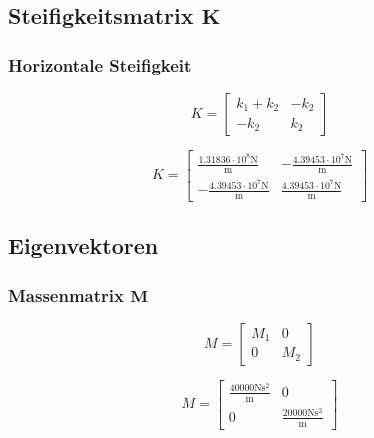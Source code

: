 \documentclass[
  letterpaper,
  DIV=11]{scrreprt}
\begin{document}
\hypertarget{steifigkeitsmatrix-mathbfk-1}{%
\subsection{\texorpdfstring{Steifigkeitsmatrix
\(\mathbf{K}\)}{Steifigkeitsmatrix \textbackslash mathbf\{K\}}}\label{steifigkeitsmatrix-mathbfk-1}}

\hypertarget{horizontale-steifigkeit-3}{%
\subsubsection{Horizontale
Steifigkeit}\label{horizontale-steifigkeit-3}}

\begin{equation}K = \left[\begin{matrix}k_{1} + k_{2} & - k_{2}\\- k_{2} & k_{2}\end{matrix}\right]\end{equation}

\begin{equation}K = \left[\begin{matrix}\frac{1.31836 \cdot 10^{8} \text{N}}{\text{m}} & - \frac{4.39453 \cdot 10^{7} \text{N}}{\text{m}}\\- \frac{4.39453 \cdot 10^{7} \text{N}}{\text{m}} & \frac{4.39453 \cdot 10^{7} \text{N}}{\text{m}}\end{matrix}\right]\end{equation}

\hypertarget{eigenvektoren-4}{%
\subsection{Eigenvektoren}\label{eigenvektoren-4}}

\hypertarget{massenmatrix-mathbfm-3}{%
\subsubsection{\texorpdfstring{Massenmatrix
\(\mathbf{M}\)}{Massenmatrix \textbackslash mathbf\{M\}}}\label{massenmatrix-mathbfm-3}}

\begin{equation}M = \left[\begin{matrix}M_{1} & 0\\0 & M_{2}\end{matrix}\right]\end{equation}

\begin{equation}M = \left[\begin{matrix}\frac{40000 \text{N} \text{s}^{2}}{\text{m}} & 0\\0 & \frac{20000 \text{N} \text{s}^{2}}{\text{m}}\end{matrix}\right]\end{equation}
\end{document}
